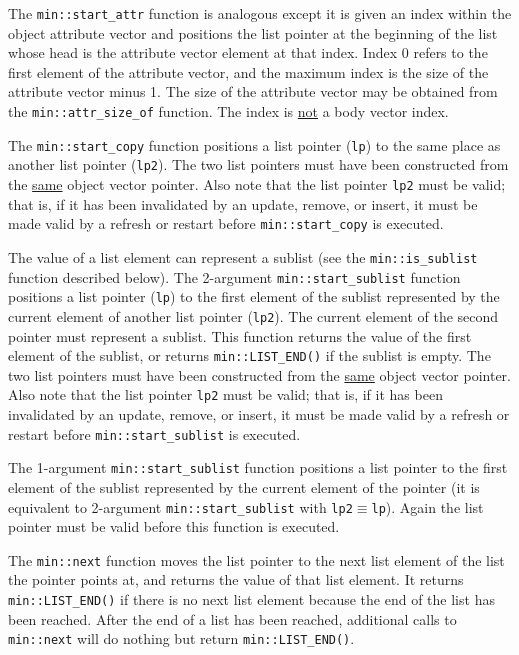 \documentclass[12pt]{article}
\newcommand{\EOL}{\penalty \exhyphenpenalty}
\begin{document}
The {\tt min::\EOL start\_\EOL attr} function is analogous except it is given
an index within the object attribute vector and positions the list pointer
at the beginning of the list whose head is the attribute vector element
at that index.  Index 0 refers to the first element of the attribute vector,
and the maximum index is the size of the attribute vector minus 1.
The size of the attribute vector may be obtained from the
{\tt min::\EOL attr\_\EOL size\_\EOL of} function.
The index is \underline{not} a body vector index.

The {\tt min::\EOL start\_\EOL copy} function
positions a list pointer ({\tt lp})
to the same place as another list pointer ({\tt lp2}).
The two list pointers must have been constructed from the \underline{same}
object vector pointer.
Also note that the list pointer {\tt lp2}
must be valid; that is, if it has been invalidated by
an update, remove, or insert, it must be made valid by a refresh or restart
before {\tt min::\EOL start\_\EOL copy} is executed.

The value of a list element can represent a sublist
(see the {\tt min::\EOL is\_\EOL sublist} function described below).
The 2-argument {\tt min::\EOL start\_\EOL sublist} function
positions a list pointer ({\tt lp})
to the first element of the sublist represented by the current
element of another list pointer ({\tt lp2}).
The current element of the second pointer must represent a sublist.
This function returns the value of the first element of
the sublist, or returns {\tt min::\EOL LIST\_\EOL END()}
if the sublist is empty.
The two list pointers must have been constructed from the \underline{same}
object vector pointer.
Also note that the list pointer {\tt lp2}
must be valid; that is, if it has been invalidated by
an update, remove, or insert, it must be made valid by a refresh or restart
before {\tt min::\EOL start\_\EOL sublist} is executed.

The 1-argument {\tt min::\EOL start\_\EOL sublist} function
positions a list pointer
to the first element of the sublist represented by the current
element of the pointer (it is equivalent to 2-argument
{\tt min::\EOL start\_\EOL sublist} with \verb|lp2|$\equiv$\verb|lp|).
Again the list pointer must be valid before this function is executed.

The {\tt min::\EOL next} function moves the list pointer
to the next list element of the
list the pointer points at, and returns the value of that
list element.  It returns {\tt min::\EOL LIST\_\EOL END()} if there is
no next list element because the end of the list has been reached.
After the end of a list has been reached, additional
calls to {\tt min::next}
will do nothing but return {\tt min::\EOL LIST\_\EOL END()}.
\end{document}
